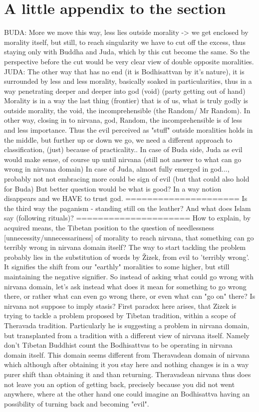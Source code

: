 \documentclass[10pt]{book}
\begin{document}
\section{A little appendix to the section}
BUDA: More we move this way, less lies outside morality -> we get enclosed by morality itself, but still, to reach singularity we have to cut off the excess, thus staying only with Buddha and Juda, which by this cut become the same. So the perspective before the cut would be very clear view of double opposite moralities.
JUDA: The other way that has no end (it is Bodhisattvan by it's nature), it is surrounded by less and less morality, basically soaked in particularities, thus in a way penetrating deeper and deeper into god (void) (party getting out of hand)
Morality is in a way the last thing (frontier) that is of us, what is truly godly is outside morality, the void, the incomprehensible (the Random/ Mr Random). In other way, closing in to nirvana, god, Random, the incomprehensible is of less and less importance.
Thus the evil perceived as "stuff" outside moralities holds in the middle, but further up or down we go, we need a different approach to classification, (just) because of practicality.. In case of Buda side, Juda as evil would make sense, of course up until nirvana (still not answer to what can go wrong in nirvana domain) In case of Juda, almost fully emerged in god..., probably not not embracing more could be sign of evil (but that could also hold for Buda) But better question would be what is good? In a way notion disappears and we HAVE to trust god.
=====================
Is the third way the paganism - standing still on the leather? And what does Islam say (following rituals)?
=====================
How to explain, by acquired means, the Tibetan position to the question of  needlessness [unnecessity/unnecessariness] of morality to reach nirvana, that something can go terribly wrong in nirvana domain itself?
The way to start tackling the problem probably lies in the substitution of words by \v Zizek, from evil to 'terribly wrong'. It signifies the shift from our "earthly" moralities to some higher, but still maintaining the negative signifier. So instead of asking what could go wrong with nirvana domain, let's ask instead what does it mean for something to go wrong there, or rather what can even go wrong there, or even what can "go on" there? Is nirvana not suppose to imply stasis?
First paradox here arises, that Zizek is trying to tackle a problem proposed by Tibetan tradition, within a scope of Theravada tradition. Particularly he is suggesting a problem in nirvana domain, but transplanted from a tradition with a different view of nirvana itself. Namely don't Tibetan Buddhist count the Bodhisattvas to be operating in nirvana domain itself. This domain seems different from Theravadean domain of nirvana which although after obtaining it you stay here and nothing changes is in a way purer shift than obtaining it and than returning. Theravadean nirvana thus does not leave you an option of getting back, precisely because you did not went anywhere, where at the other hand one could imagine an Bodhisattva having an possibility of turning back and becoming "evil".
\end{document}
